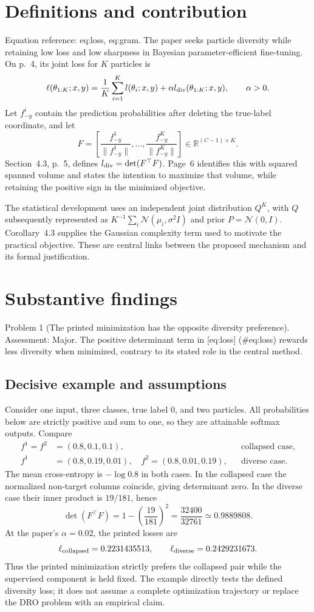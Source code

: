 \documentclass[10pt]{article}
\begin{document}
\section*{Definitions and contribution}
Equation reference: eq:loss, eq:gram. The paper seeks particle diversity while retaining low loss and low sharpness in Bayesian parameter-efficient fine-tuning. On p. 4, its joint loss for \(K\) particles is \[
 \ell(\theta_{1:K};x,y)
 =\frac1K\sum_{i=1}^K l(\theta_i;x,y)
   +\alpha l_{\rm div}(\theta_{1:K};x,y),
 \qquad \alpha>0.\] Let \(f^i_{-y}\) contain the prediction probabilities after deleting the true-label coordinate, and let \[
 F=\left[\frac{f^1_{-y}}{\|f^1_{-y}\|},\ldots,
          \frac{f^K_{-y}}{\|f^K_{-y}\|}\right]
 \in\mathbb R^{(C-1)\times K}.\] Section 4.3, p. 5, defines \(l_{\rm div}=\det(F^\top F)\). Page 6 identifies this with squared spanned volume and states the intention to maximize that volume, while retaining the positive sign in the minimized objective.\par
The statistical development uses an independent joint distribution \(Q^K\), with \(Q\) subsequently represented as \(K^{-1}\sum_i\mathcal N(\mu_i,\sigma^2I)\) and prior \(P=\mathcal N(0,I)\). Corollary 4.3 supplies the Gaussian complexity term used to motivate the practical objective. These are central links between the proposed mechanism and its formal justification.\par
\section*{Substantive findings}
Problem 1 (The printed minimization has the opposite diversity preference).  Assessment: Major. The positive determinant term in [eq:loss] (\#eq:loss) rewards less diversity when minimized, contrary to its stated role in the central method.\par
\subsection*{Decisive example and assumptions}
Consider one input, three classes, true label \(0\), and two particles. All probabilities below are strictly positive and sum to one, so they are attainable softmax outputs. Compare \[\begin{aligned}
 f^1=f^2&=(0.8,0.1,0.1), &&\text{collapsed case},\\
 f^1&=(0.8,0.19,0.01),\quad
 f^2=(0.8,0.01,0.19), &&\text{diverse case}.\end{aligned}\] The mean cross-entropy is \(-\log0.8\) in both cases. In the collapsed case the normalized non-target columns coincide, giving determinant zero. In the diverse case their inner product is \(19/181\), hence \[\det(F^\top F)=1-\left(\frac{19}{181}\right)^2
 =\frac{32400}{32761}\simeq0.9889808.\] At the paper’s \(\alpha=0.02\), the printed losses are \[\ell_{\rm collapsed}=0.2231435513,\qquad
 \ell_{\rm diverse}=0.2429231673.\] Thus the printed minimization strictly prefers the collapsed pair while the supervised component is held fixed. The example directly tests the defined diversity loss; it does not assume a complete optimization trajectory or replace the DRO problem with an empirical claim.\par
\end{document}
